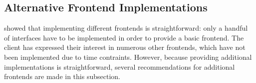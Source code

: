 

\subsection{Alternative Frontend Implementations}
\label{ssec:discuss-alternative-frontend}

 showed that implementing different frontends is
straightforward: only a handful of interfaces have to be implemented in order to
provide a basic frontend. The client has expressed their interest in numerous
other frontends, which have not been implemented due to time contraints.
However, because providing additional implementations is straightforward,
several recommendations for additional frontends are made in this subsection.





